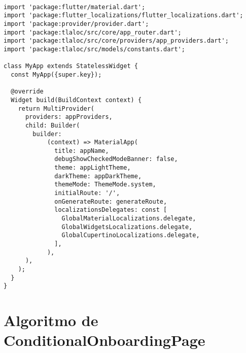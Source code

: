 \begin{verbatim}

import 'package:flutter/material.dart';
import 'package:flutter_localizations/flutter_localizations.dart';
import 'package:provider/provider.dart';
import 'package:tlaloc/src/core/app_router.dart';
import 'package:tlaloc/src/core/providers/app_providers.dart';
import 'package:tlaloc/src/models/constants.dart';  

class MyApp extends StatelessWidget {
  const MyApp({super.key});

  @override
  Widget build(BuildContext context) {
    return MultiProvider(
      providers: appProviders,
      child: Builder(
        builder:
            (context) => MaterialApp(
              title: appName,
              debugShowCheckedModeBanner: false,
              theme: appLightTheme,
              darkTheme: appDarkTheme,
              themeMode: ThemeMode.system,
              initialRoute: '/',
              onGenerateRoute: generateRoute,
              localizationsDelegates: const [
                GlobalMaterialLocalizations.delegate,
                GlobalWidgetsLocalizations.delegate,
                GlobalCupertinoLocalizations.delegate,
              ],
            ),
      ),
    );
  }
}

\end{verbatim}



\newpage

\section{Algoritmo de ConditionalOnboardingPage}
\label{anexo:alg5}


